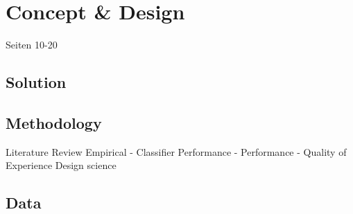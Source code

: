 \chapter{Concept \& Design}

Seiten 10-20

\section{Solution}

\section{Methodology}
Literature Review
Empirical
- Classifier Performance
- Performance
- Quality of Experience
Design science


\section{Data}




